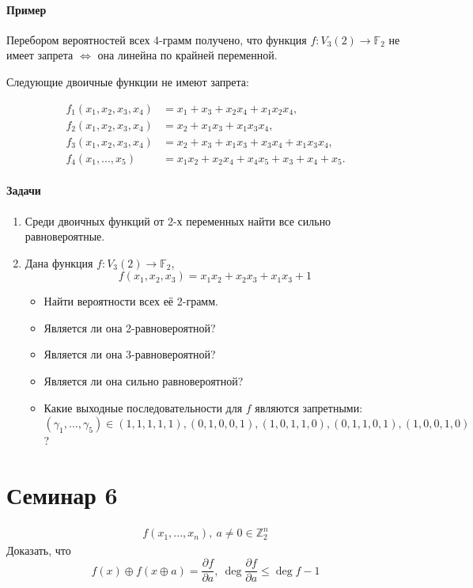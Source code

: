 \documentclass[a4paper,12pt]{article}
\newcommand{\seminary}[1]{\section*{#1}
	\addcontentsline{toc}{section}{#1}
}
\newcommand{\xor}{\oplus}
\newcommand{\partialfrac}[2]{\frac{\partial #1}{\partial #2}}
\newcommand{\ZZ}{\mathbb{Z}}
\begin{document}
	\paragraph{Пример}
	Перебором вероятностей всех 4-грамм получено, что функция $f: V_3(2) \rightarrow \mathbb{F}_2$ не имеет запрета $\Leftrightarrow$ она линейна по крайней переменной.

	Следующие двоичные функции не имеют запрета:

	$$
	\begin{aligned}
		f_1(x_1, x_2, x_3, x_4) &= x_1 + x_3 + x_2x_4 + x_1x_2x_4,\\
		f_2(x_1, x_2, x_3, x_4) &= x_2 + x_1x_3 + x_1x_3x_4,\\
		f_3(x_1, x_2, x_3, x_4) &= x_2 + x_3 + x_1x_3 + x_3x_4 + x_1x_3x_4, \\
		f_4(x_1, ..., x_5) &= x_1x_2 + x_2x_4 + x_4x_5 + x_3 + x_4 + x_5.
	\end{aligned}
	$$

	\paragraph{Задачи}
	\begin{enumerate}
		\item Среди двоичных функций от 2-х переменных найти все сильно равновероятные.
		\item Дана функция $f: V_3(2) \rightarrow \mathbb{F}_2$, \[ f(x_1, x_2, x_3) = x_1x_2 + x_2x_3 + x_1x_3 + 1 \]
		\begin{itemize}
			\item Найти вероятности всех её 2-грамм.
			\item Является ли она 2-равновероятной?
			\item Является ли она 3-равновероятной?
			\item Является ли она сильно равновероятной?
			\item Какие выходные последовательности для $f$ являются запретными: $(\gamma_1, ..., \gamma_5) \in {(1,1,1,1,1), (0,1,0,0,1), (1,0,1,1,0), (0,1,1,0,1), (1,0,0,1,0)}$ ?
		\end{itemize}
	\end{enumerate}

	\seminary{Семинар 6}
	
	$$
	\begin{aligned}
		f(x_1, ..., x_n), ~ a \not = 0 \in \ZZ_2^n
	\end{aligned}
	$$
	Доказать, что
	$$
	f(x) \xor f(x \xor a) = \partialfrac{f}{a}, ~ \deg \partialfrac{f}{a} \le \deg f -1
	$$
	
\end{document}
